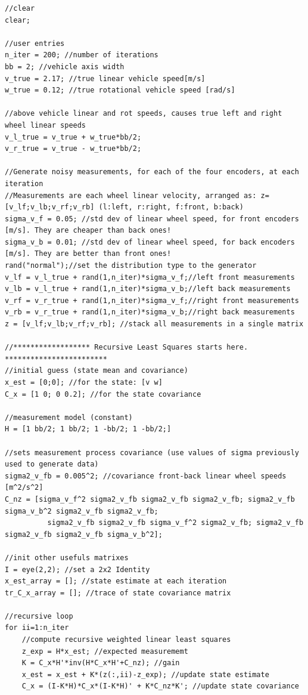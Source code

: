\begin{mdframed}
\tiny
\begin{verbatim} 
//clear
clear;

//user entries 
n_iter = 200; //number of iterations
bb = 2; //vehicle axis width
v_true = 2.17; //true linear vehicle speed[m/s]
w_true = 0.12; //true rotational vehicle speed [rad/s]

//above vehicle linear and rot speeds, causes true left and right wheel linear speeds
v_l_true = v_true + w_true*bb/2;
v_r_true = v_true - w_true*bb/2;

//Generate noisy measurements, for each of the four encoders, at each iteration
//Measurements are each wheel linear velocity, arranged as: z=[v_lf;v_lb;v_rf;v_rb] (l:left, r:right, f:front, b:back)
sigma_v_f = 0.05; //std dev of linear wheel speed, for front encoders [m/s]. They are cheaper than back ones!
sigma_v_b = 0.01; //std dev of linear wheel speed, for back encoders [m/s]. They are better than front ones!
rand("normal");//set the distribution type to the generator
v_lf = v_l_true + rand(1,n_iter)*sigma_v_f;//left front measurements
v_lb = v_l_true + rand(1,n_iter)*sigma_v_b;//left back measurements
v_rf = v_r_true + rand(1,n_iter)*sigma_v_f;//right front measurements
v_rb = v_r_true + rand(1,n_iter)*sigma_v_b;//right back measurements
z = [v_lf;v_lb;v_rf;v_rb]; //stack all measurements in a single matrix

//****************** Recursive Least Squares starts here. ************************
//initial guess (state mean and covariance)
x_est = [0;0]; //for the state: [v w]
C_x = [1 0; 0 0.2]; //for the state covariance

//measurement model (constant)
H = [1 bb/2; 1 bb/2; 1 -bb/2; 1 -bb/2;]

//sets measurement process covariance (use values of sigma previously used to generate data)
sigma2_v_fb = 0.005^2; //covariance front-back linear wheel speeds [m^2/s^2]
C_nz = [sigma_v_f^2 sigma2_v_fb sigma2_v_fb sigma2_v_fb; sigma2_v_fb sigma_v_b^2 sigma2_v_fb sigma2_v_fb;
          sigma2_v_fb sigma2_v_fb sigma_v_f^2 sigma2_v_fb; sigma2_v_fb sigma2_v_fb sigma2_v_fb sigma_v_b^2];
          
//init other usefuls matrixes
I = eye(2,2); //set a 2x2 Identity
x_est_array = []; //state estimate at each iteration
tr_C_x_array = []; //trace of state covariance matrix

//recursive loop
for ii=1:n_iter
    //compute recursive weighted linear least squares
    z_exp = H*x_est; //expected measurememt
    K = C_x*H'*inv(H*C_x*H'+C_nz); //gain
    x_est = x_est + K*(z(:,ii)-z_exp); //update state estimate
    C_x = (I-K*H)*C_x*(I-K*H)' + K*C_nz*K'; //update state covariance
    

\end{verbatim}
\end{mdframed}
